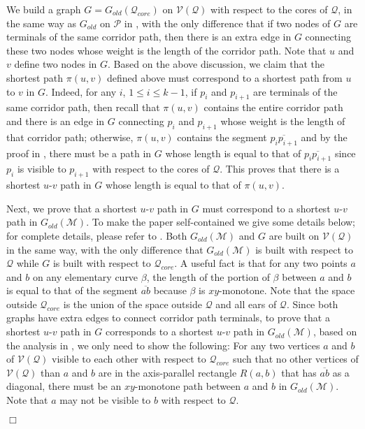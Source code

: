 \documentclass[english,runningheads,11pt]{llncs}
\def\calP{\mathcal{P}}
\def\calM{\mathcal{M}}
\def\calQ{\mathcal{Q}}
\def\calV{\mathcal{V}}
\newenvironment{proof}{\noindent {\textbf{Proof:}}\rm}{\hfill $\Box$\rm}
\begin{document}
\begin{proof}
We build a graph $G=G_{old}(\calQ_{core})$ on $\calV(\calQ)$ with
respect to the cores of $\calQ$, in the same way as $G_{old}$ on $\calP$ in
\cite{ref:ChenSh00,ref:ClarksonRe87,ref:ClarksonRe88}, with the only
difference that if two nodes of $G$ are terminals of the same corridor
path, then there is an extra edge in $G$ connecting these two nodes whose
weight is the length of the corridor path. Note that
$u$ and $v$ define two nodes in $G$. Based on the above discussion,
we claim that the shortest path $\pi(u,v)$ defined above must correspond to a
shortest path from $u$ to $v$ in $G$. Indeed, for any $i$, $1\leq
i\leq k-1$, if $p_i$ and $p_{i+1}$ are terminals of the same corridor
path, then recall that $\pi(u,v)$ contains the entire corridor path and
there is an edge in $G$ connecting $p_i$ and $p_{i+1}$ whose weight
is the length of that corridor path; otherwise, $\pi(u,v)$
contains the segment $\overline{p_ip_{i+1}}$ and by the proof in
\cite{ref:ClarksonRe87,ref:ClarksonRe88}, there must be a path in
$G$ whose length is equal to that of
$\overline{p_ip_{i+1}}$ since $p_i$ is visible to $p_{i+1}$ with
respect to the cores of $\calQ$. This proves that there is a shortest
$u$-$v$ path in $G$ whose length is equal to that of $\pi(u,v)$.

Next, we prove that a shortest $u$-$v$ path in $G$ must
correspond to a shortest $u$-$v$ path in $G_{old}(\calM)$.
To make the paper self-contained we give some details below; for complete details, please refer to \cite{ref:InkuluPl09,ref:ChenA11ESA,ref:ChenCo12arXiv}.
Both $G_{old}(\calM)$ and $G$ are built on $\calV(\calQ)$
in the same way, with
the only difference that $G_{old}(\calM)$ is built
with respect to $\calQ$ while $G$ is built
with respect to $\calQ_{core}$. A useful fact is that for
any two points $a$ and $b$ on any elementary curve $\beta$, the length of the portion of $\beta$ between
$a$ and $b$ is equal to that of the segment $\overline{ab}$ because $\beta$ is $xy$-monotone.
Note that the space outside $\calQ_{core}$ is the union
of the space outside $\calQ$ and all ears of $\calQ$.
Since both graphs have extra edges to connect corridor
path terminals, to prove that a shortest $u$-$v$ path in $G$
corresponds to a shortest $u$-$v$ path in $G_{old}(\calM)$,
based on the analysis in \cite{ref:ClarksonRe87,ref:ClarksonRe88}, we
only need to show the following: For any two vertices $a$ and $b$ of
$\calV(\calQ)$ visible to each other with respect to $\calQ_{core}$ such
that no other vertices of $\calV(\calQ)$ than $a$ and $b$ are in
the axis-parallel rectangle $R(a,b)$ that has $\overline{ab}$ as a diagonal,
there must be an $xy$-monotone path between $a$ and $b$ in
$G_{old}(\calM)$. Note that $a$ may not be visible to $b$ with respect
to $\calQ$.


\end{proof}
\end{document}

